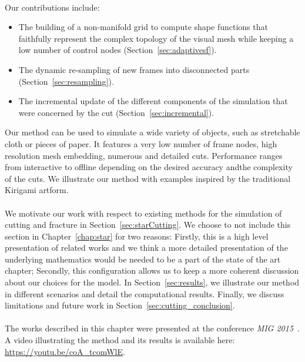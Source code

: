 \paragraph*{}
Our contributions include:
\begin{itemize}
\item The building of a non-manifold grid to compute shape functions that faithfully represent the complex topology of the visual mesh while keeping a low number of control nodes (Section~\ref{sec:adaptivesf}).
\item The dynamic re-sampling of new frames into disconnected parts (Section~\ref{sec:resampling}).
\item The incremental update of the different components of the simulation that were concerned by the cut (Section~\ref{sec:incremental}).
\end{itemize}

Our method can be used to simulate a wide variety of objects, such as stretchable cloth or pieces of paper. 
It features a very low number of frame nodes, high resolution mesh embedding, numerous and detailed cuts. 
Performance ranges from interactive to offline depending on the desired accuracy andthe complexity of the cuts.
We illustrate our method with examples inspired by the traditional Kirigami artform.
\paragraph*{}
We motivate our work with respect to existing methods for the simulation of cutting and fracture in Section~\ref{sec:starCutting}.
We choose to not include this section in Chapter~\ref{chap:star} for two reasons:
Firstly, this is a high level presentation of related works and we think a more detailed presentation of the underlying mathematics would be needed to be a part of the state of the art chapter;
Secondly, this configuration allows us to keep a more coherent discussion about our choices for the model.
In Section~\ref{sec:results}, we illustrate our method in different scenarios and detail the computational results. 
Finally, we discuss limitations and future work in Section~\ref{sec:cutting_conclusion}. 
\paragraph*{}
The works described in this chapter were presented at the conference \emph{MIG 2015}~\cite{Manteaux2015}.
A video illustrating the method and its results is available here: \url{https://youtu.be/coA_tcomWlE}.
